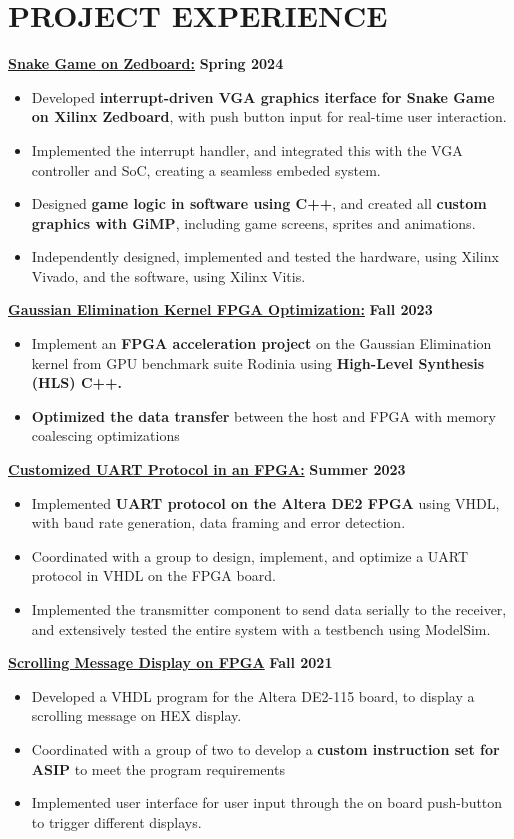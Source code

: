 \documentclass[letterpaper,11pt]{article}
\newcommand{\Item} [1] {
    \item\small{{#1 \vspace{-2pt}}}
}
\newcommand{\resumeItemListStart} [0] {
    \vspace{2pt}
    \begin{itemize}[topsep=0pt,itemsep=-2pt]
}
\newcommand{\resumeItemListEnd} [0] {
    \end{itemize}
    \vspace{5pt}
}
\begin{document}
    \section{PROJECT EXPERIENCE}
    {{\color{colorValue}} \underline{\textbf{Snake Game on Zedboard:}}} \hfill \textbf{Spring 2024}
    \resumeItemListStart{}
        \Item{Developed \textbf{interrupt-driven VGA graphics iterface for Snake Game on Xilinx Zedboard}, with push button input for real-time user interaction.}
        \Item{Implemented the interrupt handler, and integrated this with the VGA controller and SoC, creating a seamless embeded system.}
        \Item{Designed \textbf{game logic in software using C++}, and created all \textbf{custom graphics with GiMP}, including game screens, sprites and animations.}
        \Item{Independently designed, implemented and tested the hardware, using Xilinx Vivado, and the software, using Xilinx Vitis.}
    \resumeItemListEnd{}
    {{\color{colorValue}} \underline{\textbf{Gaussian Elimination Kernel FPGA Optimization:}}} \hfill \textbf{Fall 2023}
    \resumeItemListStart{}
        \Item{Implement an \textbf{FPGA acceleration project} on the Gaussian Elimination kernel from GPU benchmark suite Rodinia using \textbf{High-Level Synthesis (HLS) C++.}}
        \Item{\textbf{Optimized the data transfer} between the host and FPGA with memory coalescing optimizations}
    \resumeItemListEnd{}
    {{\color{colorValue}} \underline{\textbf{Customized UART Protocol in an FPGA:}}} \hfill \textbf{Summer 2023}
    \resumeItemListStart{}
        \Item{Implemented \textbf{UART protocol on the Altera DE2 FPGA} using VHDL, with baud rate generation, data framing and error detection.}
        \Item{Coordinated with a group to design, implement, and optimize a UART protocol in VHDL on the FPGA board.}
        \Item{Implemented the transmitter component to send data serially to the receiver, and extensively tested the entire system with a testbench using ModelSim.}
    \resumeItemListEnd{}
    {{\color{colorValue}} \underline{\textbf{Scrolling Message Display on FPGA}}} \hfill \textbf{Fall 2021}
    \resumeItemListStart{}
        \Item{Developed a VHDL program for the Altera DE2-115 board, to display a scrolling message on HEX display.}
        \Item{Coordinated with a group of two to develop a \textbf{custom instruction set for ASIP} to meet the program requirements}
        \Item{Implemented user interface for user input through the on board push-button to trigger different displays.}
    \resumeItemListEnd{}
\end{document}
